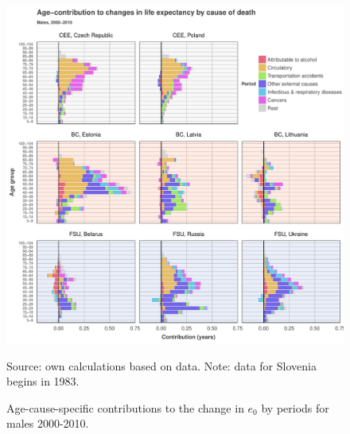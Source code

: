 \documentclass{article}
\begin{document}
\newpage
\begin{figure}[h!]
\caption{Age-cause-specific contributions to the change in $e_0$ by periods for males 2000-2010.}
\centering
\begin{center}
\includegraphics[scale=.5]{Figures/Cause_e0_decomp_Males_2.pdf}
\end{center}
Source: own calculations based on \citet{HMD} data. Note: data for Slovenia begins in 1983.
\end{figure}

\newpage
\end{document}
